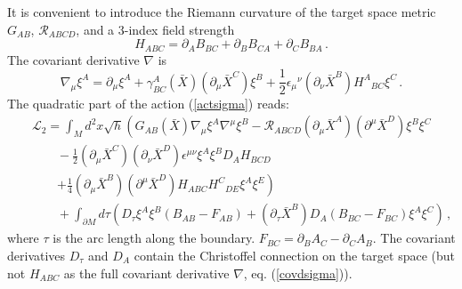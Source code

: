 It is convenient to introduce the Riemann curvature
of the target space metric $G_{AB}$, $\mathcal{R}_{ABCD}$,
and a 3-index field strength
\begin{equation}
H_{ABC}=\partial_A B_{BC} +\partial_B B_{CA}
+\partial_C B_{BA} \,.\label{HABC}
\end{equation}
The covariant derivative $\nabla$ is
\begin{equation}
\nabla_\mu \xi^A=\partial_\mu \xi^A +\gamma_{BC}^A(\bar X)
(\partial_\mu {\bar X}^C )\xi^B +\frac 12 {\epsilon_\mu}^\nu
(\partial_\nu {\bar X}^B ){H^A}_{BC}\xi^C \,.
\label{covdsigma}
\end{equation}
The quadratic part of the action (\ref{actsigma}) reads:
\begin{eqnarray}
&&\mathcal{L}_2=\int_M d^2x \sqrt{h} \left( G_{AB}(\bar X)
 \nabla_\mu \xi^A \nabla^\mu \xi^B -\mathcal{R}_{ABCD}
(\partial_\mu \bar X^A)(\partial^\mu \bar X^D) \xi^B\xi^C \right.
\nonumber \\
&&\qquad -\frac 12 (\partial_\mu \bar X^C)(\partial_\nu \bar X^D)
\epsilon^{\mu\nu} \xi^A\xi^B 
D_AH_{BCD} \nonumber \\
&&\qquad \left. +\frac 14 (\partial_\mu \bar X^B)(\partial^\mu \bar X^D )
H_{ABC}{H^C}_{DE}\xi^A\xi^E \right) \label{S2sig} \\
&&\qquad +\int_{\partial M} d\tau \left(
D_\tau \xi^A \xi^B (B_{AB}-F_{AB}) + (\partial_\tau \bar X^B)
D_A (B_{BC}-F_{BC}) \xi^A\xi^C \right) \,,\nonumber
\end{eqnarray}
where $\tau$ is the arc length along the boundary. 
$F_{BC}=\partial_B A_C-\partial_CA_B$. The covariant derivatives
$D_\tau$ and $D_A$ contain the Christoffel connection on the target
space (but not $H_{ABC}$ as 
the full covariant derivative $\nabla$, eq. (\ref{covdsigma})).

